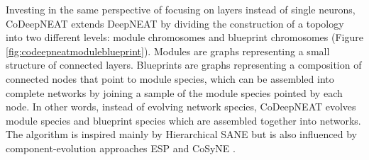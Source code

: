 \documentclass[12pt]{article}
\begin{document}

    \begin{comment}
	More recently, a different path taken from NEAT was the DeepNEAT and CoDeepNEAT variations. As described in the original work [ref Evolving Deep Neural Networks], "DeepNEAT is a most immediate extension of the standard neural network topology-evolution method NEAT to DNN. It follows the same fundamental process as NEAT: First, a population of chromosomes (each represented by a graph) with minimal complexity is created. Over generations, structure (i.e. nodes and edges) is added to the graph incrementally through mutation. During crossover, historical markings are used to determine how genes of two chromosomes can be lined up. The population is divided into species (i.e. subpopulations) based on a similarity metric. Each species grows proportionally to its fitness and evolution occurs separately in each species."
    
	"DeepNEAT differs from NEAT in that each node in the chromosome
    no longer represents a neuron, but a layer in a DNN. Each
    node contains a table of real and binary valued hyperparameters
    that are mutated through uniform Gaussian distribution and random
    bit-flipping, respectively. These hyperparameters determine
    the type of layer (such as convolutional, fully connected, or recurrent)
    and the properties of that layer (such as number of neurons,
    kernel size, and activation function). The edges in the chromosome
    are no longer marked with weights; instead they simply indicate
    how the nodes (layers) are connected together. To construct a DNN
    from a DeepNEAT chromosome, one simply needs to traverse the
    chromosome graph, replacing each node with the corresponding
    layer. The chromosome also contains a set of global hyperparameters
    applicable to the entire network (such as learning rate, training
    algorithm, and data preprocessing)." [ref Evolving Deep Neural Networks]
    \end{comment}

Investing in the same perspective of focusing on layers instead of single neurons, CoDeepNEAT extends DeepNEAT by dividing the construction of a topology into two different levels: module chromosomes and blueprint chromosomes (Figure \ref{fig:codeepneatmoduleblueprint}). Modules are graphs representing a small structure of connected layers. Blueprints are graphs representing a composition of connected nodes that point to module species, which can be assembled into complete networks by joining a sample of the module species pointed by each node. In other words, instead of evolving network species, CoDeepNEAT evolves module species and blueprint species which are assembled together into networks. The algorithm is inspired mainly by Hierarchical SANE \cite{Moriarty1997FormingNN} but is also influenced by component-evolution approaches ESP \cite{Gomez:1999:SNC:1624312.1624411} and CoSyNE \cite{gomez:jmlr08}.
\end{document}
